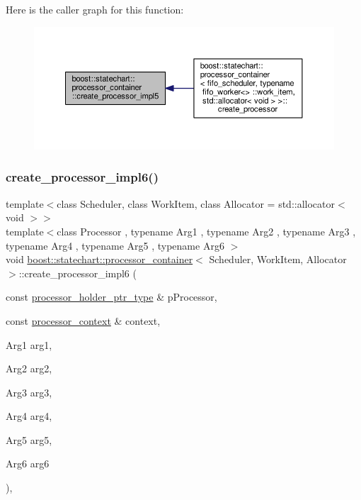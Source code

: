 Here is the caller graph for this function\+:
\nopagebreak
\begin{figure}[H]
\begin{center}
\leavevmode
\includegraphics[width=350pt]{classboost_1_1statechart_1_1processor__container_a98a9336053bc06d3486464e98f997b64_icgraph}
\end{center}
\end{figure}
\mbox{\label{classboost_1_1statechart_1_1processor__container_a14c516cb9fc15473920d5a5d79ee95db}} 
\subsubsection{\texorpdfstring{create\+\_\+processor\+\_\+impl6()}{create\_processor\_impl6()}}
{\footnotesize\ttfamily template$<$class Scheduler, class Work\+Item, class Allocator = std\+::allocator$<$ void $>$$>$ \\
template$<$class Processor , typename Arg1 , typename Arg2 , typename Arg3 , typename Arg4 , typename Arg5 , typename Arg6 $>$ \\
void \mbox{\hyperlink{classboost_1_1statechart_1_1processor__container}{boost\+::statechart\+::processor\+\_\+container}}$<$ Scheduler, Work\+Item, Allocator $>$\+::create\+\_\+processor\+\_\+impl6 (\begin{DoxyParamCaption}\item[{const \mbox{\hyperlink{classboost_1_1statechart_1_1processor__container_a885e5a42694857bfaa44ec053ed20a57}{processor\+\_\+holder\+\_\+ptr\+\_\+type}} \&}]{p\+Processor,  }\item[{const \mbox{\hyperlink{classboost_1_1statechart_1_1processor__container_1_1processor__context}{processor\+\_\+context}} \&}]{context,  }\item[{Arg1}]{arg1,  }\item[{Arg2}]{arg2,  }\item[{Arg3}]{arg3,  }\item[{Arg4}]{arg4,  }\item[{Arg5}]{arg5,  }\item[{Arg6}]{arg6 }\end{DoxyParamCaption})\hspace{0.3cm}{\ttfamily [inline]}, {\ttfamily [private]}}

